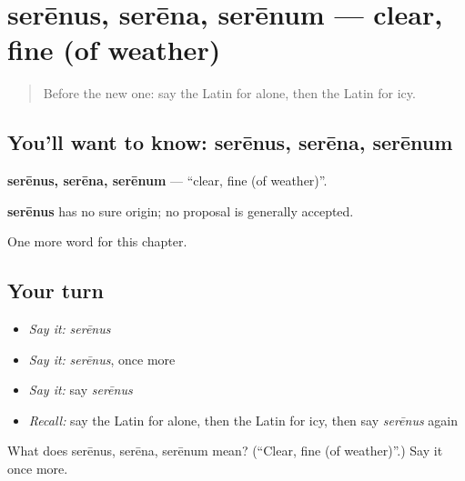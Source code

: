 \section[serēnus, serēna, serēnum]{serēnus, serēna, serēnum — clear, fine (of weather)}

\label{lesson:LA-C152-serenus}



\begin{quote}
Before the new one: say the Latin for alone, then the Latin for icy.
\end{quote}

\subsection*{You'll want to know: serēnus, serēna, serēnum}
\textbf{serēnus, serēna, serēnum} — \textquotedblleft{}clear, fine (of weather)\textquotedblright{}.

\begin{cousinweb}
\textbf{serēnus} has no sure origin; no proposal is generally accepted.
\end{cousinweb}

\begin{grammarlens}[title={What you've built}]
One more word for this chapter.
\end{grammarlens}

\subsection*{Your turn}
\begin{itemize}
\raggedright
  \item \emph{Say it:} \emph{serēnus}
  \item \emph{Say it:} \emph{serēnus}, once more
  \item \emph{Say it:} say \emph{serēnus}
  \item \emph{Recall:} say the Latin for alone, then the Latin for icy, then say \emph{serēnus} again
\end{itemize}

\begin{tcolorbox}[breakable,colback=teal!4,colframe=teal!35!black,title={Before you move on}]
What does serēnus, serēna, serēnum mean? (\textquotedblleft{}Clear, fine (of weather)\textquotedblright{}.) Say it once more.
\end{tcolorbox}
